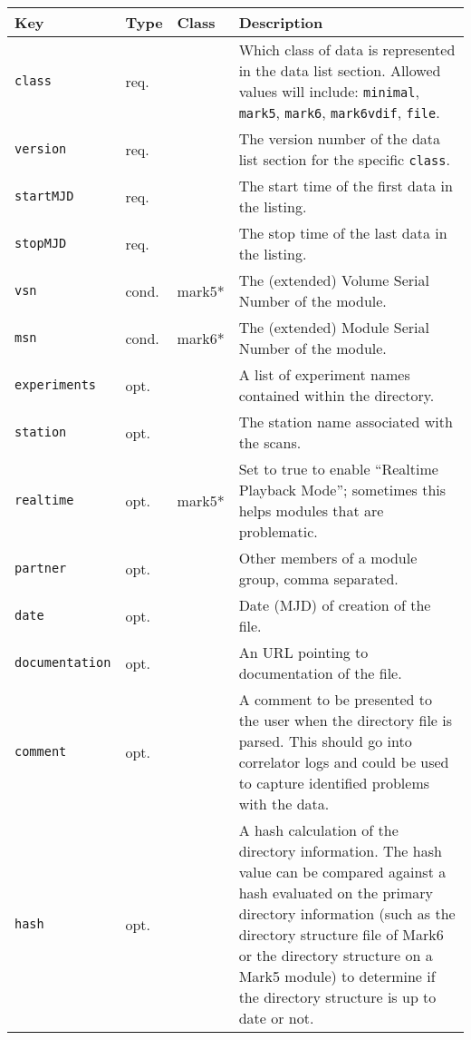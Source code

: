 \documentclass[12pt]{article}
\begin{document}
\begin{table}[h]
\begin{tabularx}{\textwidth}{lllX}
\hline
Key & Type & Class & Description \\
\hline
{\tt class}             & req.  &        & Which class of data is represented in the data list section.  
Allowed values will include: {\tt minimal}, {\tt mark5}, {\tt mark6}, {\tt mark6vdif}, {\tt file}. \\
{\tt version}           & req.  &        & The version number of the data list section for the specific {\tt class}. \\
{\tt startMJD}          & req.  &        & The start time of the first data in the listing. \\
{\tt stopMJD}           & req.  &        & The stop time of the last data in the listing. \\
{\tt vsn}               & cond. & mark5* & The (extended) Volume Serial Number of the module. \\
{\tt msn}               & cond. & mark6* & The (extended) Module Serial Number of the module. \\
{\tt experiments}       & opt.  &        & A list of experiment names contained within the directory. \\
{\tt station}           & opt.  &        & The station name associated with the scans. \\
{\tt realtime}          & opt.  & mark5* & Set to true to enable ``Realtime Playback Mode''; sometimes this helps modules that are problematic. \\
{\tt partner}           & opt.  &        & Other members of a module group, comma separated. \\
{\tt date}              & opt.  &        & Date (MJD) of creation of the file. \\
{\tt documentation}     & opt.  &        & An URL pointing to documentation of the file. \\
{\tt comment}           & opt.  &        & A comment to be presented to the user when the directory file is parsed.  This should go into correlator logs and could be used to capture identified problems with the data. \\
{\tt hash}              & opt.  &        & A hash calculation of the directory information. The hash value can be compared against a hash evaluated on the primary directory information (such as the directory structure file of Mark6 or the directory structure on a Mark5 module) to determine if the directory structure is up to date or not. \\

\end{tabularx}
\end{table}
\end{document}
